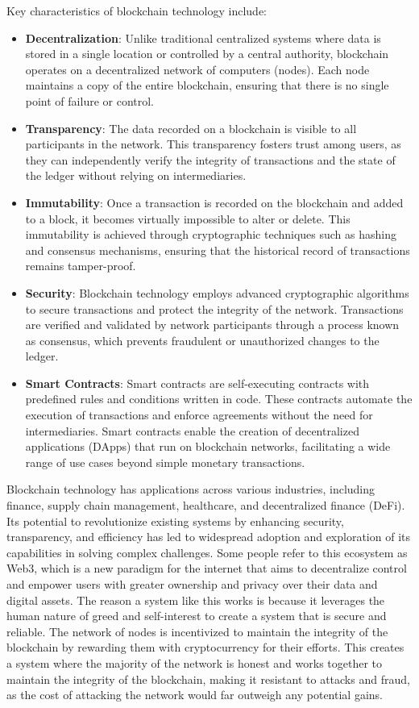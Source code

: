 Key characteristics of blockchain technology include:
\begin{itemize}
    \item \textbf{Decentralization}: Unlike traditional centralized systems where data is stored in a single location or controlled by a central authority, blockchain operates on a decentralized network of computers (nodes). Each node maintains a copy of the entire blockchain, ensuring that there is no single point of failure or control.
    \item \textbf{Transparency}: The data recorded on a blockchain is visible to all participants in the network. This transparency fosters trust among users, as they can independently verify the integrity of transactions and the state of the ledger without relying on intermediaries.
    \item \textbf{Immutability}: Once a transaction is recorded on the blockchain and added to a block, it becomes virtually impossible to alter or delete. This immutability is achieved through cryptographic techniques such as hashing and consensus mechanisms, ensuring that the historical record of transactions remains tamper-proof.
    \item \textbf{Security}: Blockchain technology employs advanced cryptographic algorithms to secure transactions and protect the integrity of the network. Transactions are verified and validated by network participants through a process known as consensus, which prevents fraudulent or unauthorized changes to the ledger.
    \item \textbf{Smart Contracts}: Smart contracts are self-executing contracts with predefined rules and conditions written in code. These contracts automate the execution of transactions and enforce agreements without the need for intermediaries. Smart contracts enable the creation of decentralized applications (DApps) that run on blockchain networks, facilitating a wide range of use cases beyond simple monetary transactions.
\end{itemize}

Blockchain technology has applications across various industries, including finance, supply chain management, healthcare, and decentralized finance (DeFi). Its potential to revolutionize existing systems by enhancing security, transparency, and efficiency has led to widespread adoption and exploration of its capabilities in solving complex challenges. Some people refer to this ecosystem as Web3, which is a new paradigm for the internet that aims to decentralize control and empower users with greater ownership and privacy over their data and digital assets.
The reason a system like this works is because it leverages the human nature of greed and self-interest to create a system that is secure and reliable. The network of nodes is incentivized to maintain the integrity of the blockchain by rewarding them with cryptocurrency for their efforts. This creates a system where the majority of the network is honest and works together to maintain the integrity of the blockchain, making it resistant to attacks and fraud, as the cost of attacking the network would far outweigh any potential gains.

